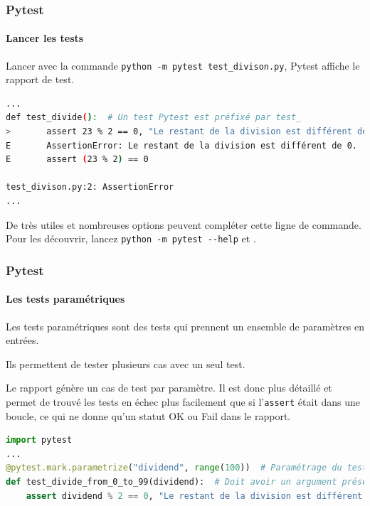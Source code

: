 \documentclass{beamer}
\begin{document}
    \begin{frame}[fragile]
        \frametitle{Pytest}
        \framesubtitle{Lancer les tests}
        \transdissolve
        Lancer avec la commande \lstinline{python -m pytest test_divison.py}, Pytest affiche le rapport de test.
        \begin{lstlisting}[language=sh]
...
def test_divide():  # Un test Pytest est préfixé par test_
>       assert 23 % 2 == 0, "Le restant de la division est différent de 0."
E       AssertionError: Le restant de la division est différent de 0.
E       assert (23 % 2) == 0

test_divison.py:2: AssertionError
...
        \end{lstlisting}

        De très utiles et nombreuses options peuvent compléter cette ligne de commande.
        Pour les découvrir, lancez \lstinline{python -m pytest --help} et .
    \end{frame}

    \begin{frame}[fragile]
        \frametitle{Pytest}
        \framesubtitle{Les tests paramétriques}
        \transdissolve
        Les tests paramétriques sont des tests qui prennent un ensemble de paramètres en entrées.

        Ils permettent de tester plusieurs cas avec un seul test.

        Le rapport génère un cas de test par paramètre.
        Il est donc plus détaillé et permet de trouvé
        les tests en échec plus facilement que si l'\lstinline {assert} était dans une boucle, ce qui ne donne qu'un statut OK ou Fail dans le rapport.
        \begin{lstlisting}[language=Python]
import pytest
...
@pytest.mark.parametrize("dividend", range(100))  # Paramétrage du test
def test_divide_from_0_to_99(dividend):  # Doit avoir un argument présent dans le paramétrage
    assert dividend % 2 == 0, "Le restant de la division est différent de 0."
        \end{lstlisting}
    \end{frame}
\end{document}
